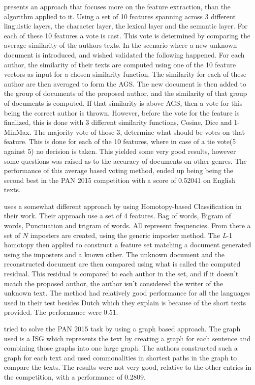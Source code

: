 \cite{castro2015Paper} presents an approach that focuses more on the feature
extraction, than the algorithm applied to it. Using a set of 10 features
spanning across 3 different linguistic layers, the character layer, the lexical
layer and the semantic layer. For each of these 10 features a vote is cast. This
vote is determined by comparing the average similarity of the authors texts. In
the scenario where a new unknown document is introduced, and wished validated
the following happened. For each author, the similarity of their texts are
computed using one of the 10 feature vectors as input for a chosen similarity
function. The similarity for each of these author are then averaged to form
the \gls{AGS}. The new document is then added to the group of documents of the
proposed author, and the similarity of that group of documents is computed.
If that similarity is above \gls{AGS}, then a vote for this being the correct
author is thrown. However, before the vote for the feature is finalized, this
is done with 3 different similarity functions, Cosine, Dice and 1-MinMax. The
majority vote of those 3, determine what should be votes on that feature. This
is done for each of the 10 features, where in case of a tie vote(5 against 5) no
decision is taken. This yielded some very good results, however some questions
was raised as to the accuracy of documents on other genres. The performance of
this average based voting method, ended up being being the second best in the
PAN 2015 competition with a score of 0.52041 on English texts.

\cite{gutierrez2015} uses a somewhat different approach by using Homotopy-based
Classification in their work. Their approach use a set of 4 features. Bag
of words, Bigram of words, Punctuation and trigram of words. All represent
frequencies. From there a set of $N$ imposters are created, using the generic
imposter method. The \textit{L}-1 homotopy then applied to construct a feature
set matching a document generated using the imposters and a known other. The
unknown document and the reconstructed document are then compared using what is
called the computed residual. This residual is compared to each author in the
set, and if it doesn't match the proposed author, the author isn't considered
the writer of the unknown text. The method had relatively good performance
for all the languages used in their test besides Dutch which they explain is
because of the short texts provided. The performance were 0.51.

\cite{gomezadorno2015} tried to solve the PAN 2015 task by using a graph based
approach. The graph used is a \gls{ISG} which represents the text by creating
a graph for each sentence and combining those graphs into one large graph.
The authors constructed such a graph for each text and used commonalities in
shortest paths in the graph to compare the texts. The results were not very
good, relative to the other entries in the competition, with a performance of
0.2809.


